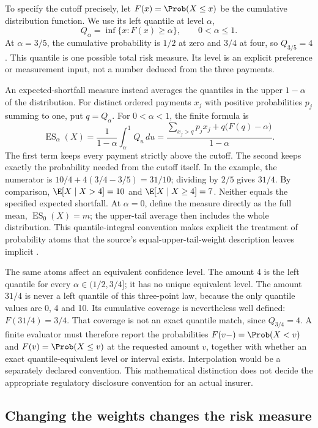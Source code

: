 To specify the cutoff precisely, let $F(x)=\Prob(X\leq x)$ be the cumulative
distribution function. We use its left quantile at level $\alpha$,
\[
 Q_\alpha=\inf\{x:F(x)\geq\alpha\},\qquad 0<\alpha\leq1.
\]
At $\alpha=3/5$, the cumulative probability is $1/2$ at zero and $3/4$ at
four, so $Q_{3/5}=4$. This quantile is one possible total risk measure.
Its level is an explicit preference or measurement input, not a number
deduced from the three payments.

An expected-shortfall measure instead averages the quantiles in the upper
$1-\alpha$ of the distribution. For distinct ordered payments $x_j$ with
positive probabilities $p_j$ summing to one, put $q=Q_\alpha$.
For $0<\alpha<1$, the finite formula is
\[
 \operatorname{ES}_\alpha(X)
 =\frac{1}{1-\alpha}\int_\alpha^1 Q_u\,du
 =\frac{\displaystyle\sum_{x_j>q}p_jx_j
             +q\bigl(F(q)-\alpha\bigr)}{1-\alpha}.
\]
The first term keeps every payment strictly above the cutoff. The second
keeps exactly the probability needed from the cutoff itself. In the example,
the numerator is $10/4+4(3/4-3/5)=31/10$; dividing by $2/5$ gives $31/4$.
By comparison, $\E[X\mid X>4]=10$ and $\E[X\mid X\geq4]=7$.
Neither equals the specified expected shortfall. At $\alpha=0$, define the
measure directly as the full mean, $\operatorname{ES}_0(X)=m$; the upper-tail
average then includes the whole distribution. This quantile-integral
convention makes explicit the treatment of probability atoms that the
source's equal-upper-tail-weight description leaves implicit
\citep[Section 6]{england2019lifetime}.

The same atoms affect an equivalent confidence level. The amount 4 is the
left quantile for every $\alpha\in(1/2,3/4]$; it has no unique equivalent
level. The amount $31/4$ is never a left quantile of this three-point law,
because the only quantile values are 0, 4 and 10. Its cumulative coverage is
nevertheless well defined: $F(31/4)=3/4$. That coverage is not an exact
quantile match, since $Q_{3/4}=4$. A finite evaluator must therefore report
the probabilities $F(v-)=\Prob(X<v)$ and $F(v)=\Prob(X\leq v)$ at the
requested amount $v$, together with whether an exact quantile-equivalent
level or interval exists. Interpolation would be a separately declared
convention. This mathematical distinction does not decide the appropriate
regulatory disclosure convention for an actual insurer.

\subsection{Changing the weights changes the risk measure}


